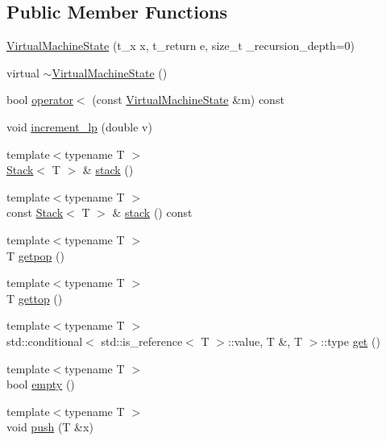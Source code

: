 \subsection*{Public Member Functions}
\begin{DoxyCompactItemize}
\item 
\hyperlink{class_virtual_machine_state_a650ed7d917a116595deb00e7136c0824}{Virtual\+Machine\+State} (t\+\_\+x x, t\+\_\+return e, size\+\_\+t \+\_\+recursion\+\_\+depth=0)
\item 
virtual \hyperlink{class_virtual_machine_state_a2ad904247c9b67eb9467890d484e82a8}{$\sim$\+Virtual\+Machine\+State} ()
\item 
bool \hyperlink{class_virtual_machine_state_adc1ead080f59258b39565d16cb836629}{operator$<$} (const \hyperlink{class_virtual_machine_state}{Virtual\+Machine\+State} \&m) const
\item 
void \hyperlink{class_virtual_machine_state_affbb1cc7171793735cbc4cdd94b987bb}{increment\+\_\+lp} (double v)
\item 
{\footnotesize template$<$typename T $>$ }\\\hyperlink{class_stack}{Stack}$<$ T $>$ \& \hyperlink{class_virtual_machine_state_a25fc669934ea3f85f0875ee272c69c2d}{stack} ()
\item 
{\footnotesize template$<$typename T $>$ }\\const \hyperlink{class_stack}{Stack}$<$ T $>$ \& \hyperlink{class_virtual_machine_state_a791721cfdddd5f3134a201c3a2250af9}{stack} () const
\item 
{\footnotesize template$<$typename T $>$ }\\T \hyperlink{class_virtual_machine_state_a0d5aba3d124a9e987113a1440fec64b5}{getpop} ()
\item 
{\footnotesize template$<$typename T $>$ }\\T \hyperlink{class_virtual_machine_state_aa721c5fcd32593015f48c44af8edd594}{gettop} ()
\item 
{\footnotesize template$<$typename T $>$ }\\std\+::conditional$<$ std\+::is\+\_\+reference$<$ T $>$\+::value, T \&, T $>$\+::type \hyperlink{class_virtual_machine_state_ad29d1a4f0a8943dccf98cdcbe16089fe}{get} ()
\item 
{\footnotesize template$<$typename T $>$ }\\bool \hyperlink{class_virtual_machine_state_a15659c007860b21ccb0cb15aa32d778a}{empty} ()
\item 
{\footnotesize template$<$typename T $>$ }\\void \hyperlink{class_virtual_machine_state_a48711af9c2908c6f5e6f4edb1bc803ed}{push} (T \&x)

\end{DoxyCompactItemize}
